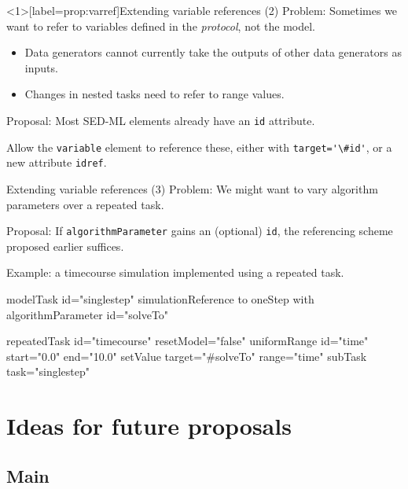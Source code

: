\documentclass[t,xcolor={usenames,dvipsnames}]{beamer}
\newcommand{\sedml}[1]{\lstinline[basicstyle=\color{blue}]!#1!}
\begin{document}

\begin{frame}<1>[label=prop:varref]{Extending variable references (2)}
\alert{Problem}:
 Sometimes we want to refer to variables defined in the
 \emph{protocol}, not the model.

\begin{itemize}
\item
 Data generators cannot currently take the outputs of other data
 generators as inputs.
\item
 Changes in nested tasks need to refer to range values.
\end{itemize}

\alert{Proposal}:
 Most SED-ML elements already have an \sedml{id} attribute.

 Allow the \sedml{variable} element to reference these, either with
 \sedml{target='\#id'}, or a new attribute \sedml{idref}.
\end{frame}


\begin{frame}[fragile=singleslide]{Extending variable references (3)}
\alert{Problem}:
 We might want to vary algorithm parameters over a repeated task.

\alert{Proposal}:
 If \sedml{algorithmParameter} gains an (optional) \sedml{id}, the
 referencing scheme proposed earlier suffices.

Example: a timecourse simulation implemented using a repeated task.
\begin{blksedml}
modelTask id="singlestep"
  simulationReference to
    oneStep with algorithmParameter id="solveTo"

repeatedTask id="timecourse" resetModel="false"
  uniformRange id="time" start="0.0" end="10.0"
  setValue target="#solveTo" range="time"
  subTask task="singlestep"
\end{blksedml}
\end{frame}


\section{Ideas for future proposals}
\subsection*{Main}
\end{document}
